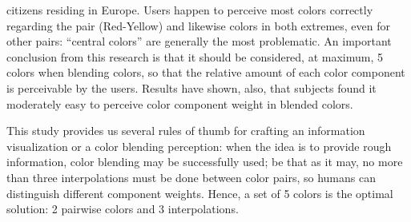 citizens residing in Europe. Users happen to perceive most colors correctly regarding the pair (Red-Yellow)
and likewise colors in both extremes, even for other pairs: “central colors” are generally the most
problematic. An important conclusion from this research is that it should be considered, at maximum, 5
colors when blending colors, so that the relative amount of each color component is perceivable by the
users. Results have shown, also, that subjects found it moderately easy to perceive color component
weight in blended colors. \par
%
This study provides us several rules of thumb for crafting an information visualization or a color
blending perception: when the idea is to provide rough information, color blending may be successfully
used; be that as it may, no more than three interpolations must be done between color pairs, so humans
can distinguish different component weights. Hence, a set of 5 colors is the optimal solution: 2
pairwise colors and 3 interpolations. \par
%
